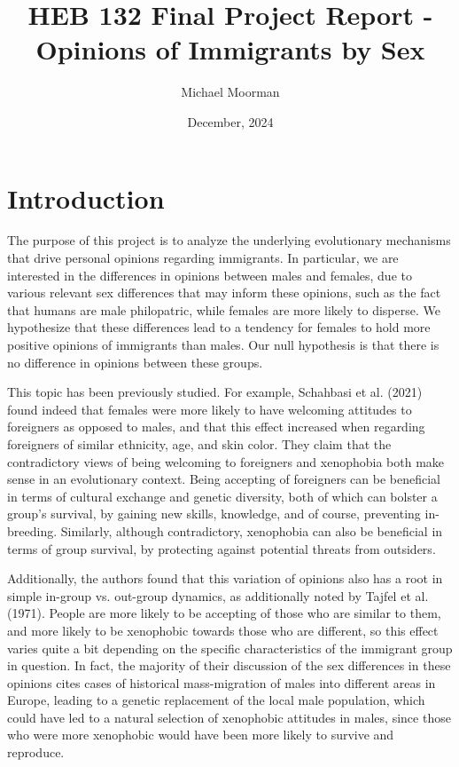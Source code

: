 \documentclass{article}
\title{HEB 132 Final Project Report - Opinions of Immigrants by Sex}
\author{Michael Moorman}
\date{December, 2024}
\begin{document}
\fontsize{11.8}{12}\selectfont

\maketitle

\section{Introduction}

The purpose of this project is to analyze the underlying evolutionary mechanisms that drive personal opinions regarding immigrants. In particular, we are interested in the differences in opinions between males and females, due to various relevant sex differences that may inform these opinions, such as the fact that humans are male philopatric\cite{malePhilopatry}, while females are more likely to disperse\cite{femaleDispersal}. We hypothesize that these differences lead to a tendency for females to hold more positive opinions of immigrants than males. Our null hypothesis is that there is no difference in opinions between these groups.

This topic has been previously studied. For example, Schahbasi et al. (2021) found indeed that females were more likely to have welcoming attitudes to foreigners as opposed to males, and that this effect increased when regarding foreigners of similar ethnicity, age, and skin color\cite{immigrantOpinions}. They claim that the contradictory views of being welcoming to foreigners and xenophobia both make sense in an evolutionary context. Being accepting of foreigners can be beneficial in terms of cultural exchange and genetic diversity, both of which can bolster a group's survival, by gaining new skills, knowledge, and of course, preventing in-breeding. Similarly, although contradictory, xenophobia can also be beneficial in terms of group survival, by protecting against potential threats from outsiders.

Additionally, the authors found that this variation of opinions also has a root in simple in-group vs. out-group dynamics, as additionally noted by Tajfel et al. (1971)\cite{ingroup}. People are more likely to be accepting of those who are similar to them, and more likely to be xenophobic towards those who are different, so this effect varies quite a bit depending on the specific characteristics of the immigrant group in question. In fact, the majority of their discussion of the sex differences in these opinions cites cases of historical mass-migration of males into different areas in Europe, leading to a genetic replacement of the local male population, which could have led to a natural selection of xenophobic attitudes
in males, since those who were more xenophobic would have been more likely to survive and reproduce.
\end{document}
